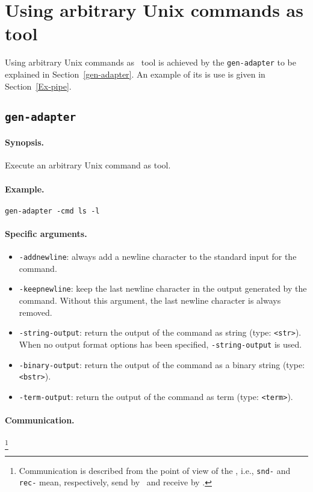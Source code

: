 
\section{\label{ToolsFromUnix}Using arbitrary Unix commands as tool}

Using arbitrary Unix commands as \TB\ tool is achieved by the {\tt gen-adapter}
to be explained in Section~\ref{gen-adapter}.
An example of its is use is given in Section~\ref{Ex-pipe}.


\subsection{\label{gen-adapter}{\tt gen-adapter}}

\paragraph{Synopsis.} Execute an arbitrary Unix command as tool.

\paragraph{Example.} {\tt gen-adapter -cmd ls -l}

\paragraph{Specific arguments.}
\begin{itemize}
\item {\tt -addnewline}: always add a newline character to the standard input for the command.
\item {\tt -keepnewline}: keep the last newline character
in the output generated by the command. Without this argument, 
the last newline character is always removed.
\item \texttt{-string-output}: return the output of the command as string
(type: \texttt{<str>}). When no output format options has been specified,
\texttt{-string-output} is used.
\item {\tt -binary-output}: return the output of the command
as a binary string (type: {\tt <bstr>}).
\item \texttt{-term-output}: return the output of the command as term (type:
\texttt{<term>}).
\end{itemize}

\paragraph{Communication.}  \hspace{-0.3cm}\footnote{Communication is described
from the point of view of the \TB, i.e., {\tt snd-} and {\tt rec-}
mean, respectively, send by \TB\ and receive by \TB.}

